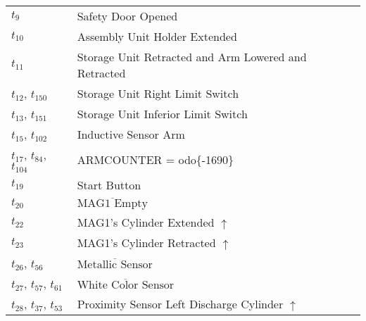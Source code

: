 \begin{longtable}{M{5cm}M{10cm}}
\hyperlink{completeNet:t9}{\hypertarget{completeTable:t9}{$t_{9}$}} & Safety Door Opened\\
\hyperlink{completeNet:t10}{\hypertarget{completeTable:t10}{$t_{10}$}} & Assembly Unit Holder Extended\\
\hyperlink{completeNet:t11}{\hypertarget{completeTable:t11}{$t_{11}$}} & Storage Unit Retracted and Arm Lowered and Retracted\\
\hyperlink{completeNet:t12}{\hypertarget{completeTable:t12}{$t_{12}$}}, \hyperlink{completeNet:t150}{\hypertarget{completeTable:t150}{$t_{150}$}} & Storage Unit Right Limit Switch\\
\hyperlink{completeNet:t13}{\hypertarget{completeTable:t13}{$t_{13}$}}, \hyperlink{completeNet:t151}{\hypertarget{completeTable:t151}{$t_{151}$}} & Storage Unit Inferior Limit Switch\\
\hyperlink{completeNet:t15}{\hypertarget{completeTable:t15}{$t_{15}$}}, \hyperlink{completeNet:t102}{\hypertarget{completeTable:t102}{$t_{102}$}} & Inductive Sensor Arm\\
\hyperlink{completeNet:t17}{\hypertarget{completeTable:t17}{$t_{17}$}}, \hyperlink{completeNet:t84}{\hypertarget{completeTable:t84}{$t_{84}$}}, \hyperlink{completeNet:t104}{\hypertarget{completeTable:t104}{$t_{104}$}} & ARMCOUNTER = 	odo\{-1690\}\\
\hyperlink{completeNet:t19}{\hypertarget{completeTable:t19}{$t_{19}$}} & Start Button\\
\hyperlink{completeNet:t20}{\hypertarget{completeTable:t20}{$t_{20}$}} & \(\overline{\mbox{MAG1 Empty}}\)\\
\hyperlink{completeNet:t22}{\hypertarget{completeTable:t22}{$t_{22}$}} & MAG1's Cylinder Extended \(\uparrow\)\\
\hyperlink{completeNet:t23}{\hypertarget{completeTable:t23}{$t_{23}$}} & MAG1's Cylinder Retracted \(\uparrow\)\\
\hyperlink{completeNet:t26}{\hypertarget{completeTable:t26}{$t_{26}$}}, \hyperlink{completeNet:t56}{\hypertarget{completeTable:t56}{$t_{56}$}} & \(\overline{\mbox{Metallic Sensor}}\)\\
\hyperlink{completeNet:t27}{\hypertarget{completeTable:t27}{$t_{27}$}}, \hyperlink{completeNet:t57}{\hypertarget{completeTable:t57}{$t_{57}$}}, \hyperlink{completeNet:t61}{\hypertarget{completeTable:t61}{$t_{61}$}} & \(\overline{\mbox{White Color Sensor}}\)\\
\hyperlink{completeNet:t28}{\hypertarget{completeTable:t28}{$t_{28}$}}, \hyperlink{completeNet:t37}{\hypertarget{completeTable:t37}{$t_{37}$}}, \hyperlink{completeNet:t53}{\hypertarget{completeTable:t53}{$t_{53}$}} & Proximity Sensor Left Discharge Cylinder \(\uparrow\)\\

\end{longtable}
